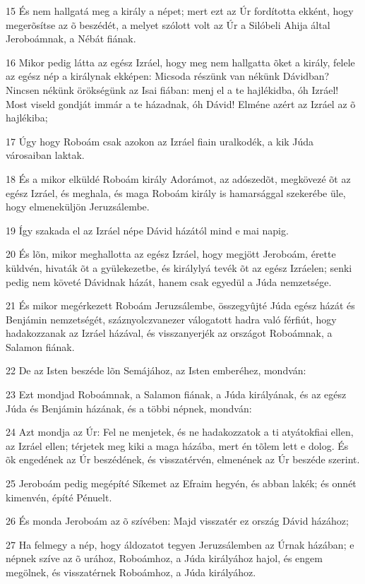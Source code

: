 \par 15 És nem hallgatá meg a király a népet; mert ezt az Úr fordította ekként, hogy megerõsítse az õ beszédét, a melyet szólott volt az Úr a Silóbeli Ahija által Jeroboámnak, a Nébát fiának.
\par 16 Mikor pedig látta az egész Izráel, hogy meg nem hallgatta õket a király, felele az egész nép a királynak ekképen: Micsoda részünk van nékünk Dávidban? Nincsen nékünk örökségünk  az Isai fiában: menj el a te hajlékidba, óh Izráel! Most viseld gondját immár a te házadnak, óh Dávid! Elméne azért az Izráel az õ hajlékiba;
\par 17 Úgy hogy Roboám csak azokon az Izráel fiain uralkodék, a kik Júda városaiban laktak.
\par 18 És a mikor elküldé Roboám király Adorámot, az adószedõt, megkövezé õt az egész Izráel, és meghala, és maga Roboám király is hamarsággal szekerébe üle, hogy elmeneküljön Jeruzsálembe.
\par 19 Így szakada el az Izráel népe Dávid házától mind e mai napig.
\par 20 És lõn, mikor meghallotta az egész Izráel, hogy megjött Jeroboám, érette küldvén, hivaták õt a gyülekezetbe, és királylyá tevék õt az egész Izráelen; senki pedig nem követé Dávidnak házát, hanem csak egyedül a Júda nemzetsége.
\par 21 És mikor megérkezett Roboám Jeruzsálembe, összegyûjté Júda egész házát és Benjámin nemzetségét, száznyolczvanezer válogatott hadra való férfiút, hogy hadakozzanak az Izráel házával, és visszanyerjék az országot Roboámnak, a Salamon fiának.
\par 22 De az Isten beszéde lõn Semájához, az Isten emberéhez, mondván:
\par 23 Ezt mondjad Roboámnak, a Salamon fiának, a Júda királyának, és az egész Júda és Benjámin házának, és a többi népnek, mondván:
\par 24 Azt mondja az Úr: Fel ne menjetek, és ne hadakozzatok a ti atyátokfiai ellen, az Izráel ellen; térjetek meg kiki a maga házába, mert én tõlem lett e dolog. És õk engedének az Úr beszédének, és visszatérvén, elmenének az Úr beszéde szerint.
\par 25 Jeroboám pedig megépíté Síkemet az Efraim hegyén, és abban lakék; és onnét kimenvén, építé Pénuelt.
\par 26 És monda Jeroboám az õ szívében: Majd visszatér ez ország Dávid házához;
\par 27 Ha felmegy a nép, hogy áldozatot tegyen Jeruzsálemben az Úrnak házában; e népnek szíve az õ urához, Roboámhoz, a Júda királyához hajol, és engem megölnek, és visszatérnek Roboámhoz, a Júda királyához.
